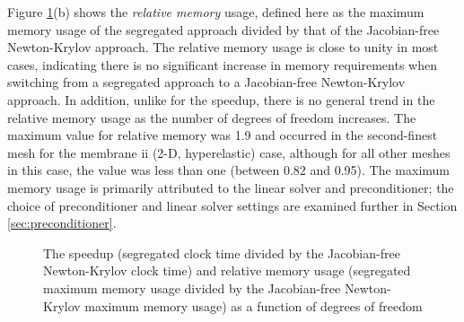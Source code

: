 \documentclass[sn-mathphys,Numbered]{sn-jnl}%
\begin{document}
Figure \ref{fig:speedup_rel_mem}(b) shows the \emph{relative memory} usage, defined here as the maximum memory usage of the segregated approach divided by that of the Jacobian-free Newton-Krylov approach.
The relative memory usage is close to unity in most cases, indicating there is no significant increase in memory requirements when switching from a segregated approach to a Jacobian-free Newton-Krylov approach.
In addition, unlike for the speedup, there is no general trend in the relative memory usage as the number of degrees of freedom increases.
The maximum value for relative memory was 1.9 and occurred in the second-finest mesh for the membrane ii (2-D, hyperelastic) case, although for all other meshes in this case, the value was less than one (between 0.82 and 0.95).
The maximum memory usage is primarily attributed to the linear solver and preconditioner; the choice of preconditioner and linear solver settings are examined further in Section \ref{sec:preconditioner}.
\begin{figure}[htbp]
   \centering
   \caption{The speedup (segregated clock time divided by the Jacobian-free Newton-Krylov clock time) and relative memory usage (segregated maximum memory usage divided by the Jacobian-free Newton-Krylov maximum memory usage) as a function of degrees of freedom}
   \label{fig:speedup_rel_mem}
\end{figure}

%
\end{document}
